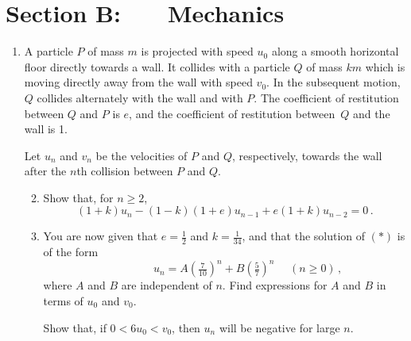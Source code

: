 \documentclass[a4, 11pt]{report}
\newlength{\qspace}
\newcounter{qnumber}
\newenvironment{question}%
 {\vspace{\qspace}
  \begin{enumerate}[\bfseries 1\quad][10]%
    \setcounter{enumi}{\value{qnumber}}%
    \item%
 }
{
  \end{enumerate}
  \filbreak
  \stepcounter{qnumber}
 }
\newenvironment{questionparts}[1][1]%
 {
  \begin{enumerate}[\bfseries (i)]%
    \setcounter{enumii}{#1}
    \addtocounter{enumii}{-1}
    \setlength{\itemsep}{3mm}
    \setlength{\parskip}{8pt}
 }
 {
  \end{enumerate}
 }
\def\ge{\geqslant}
\begin{document}
\newpage

\section*{Section B: \ \ \ Mechanics}


\begin{question}
A particle $P$ of mass $m$ is projected 
with speed $u_0$
 along a smooth
horizontal floor
directly towards a wall.
 It collides with a particle $Q$ of mass
$km$ which is moving directly away from the wall
with speed
$v_0$. 
In the subsequent motion, $Q$ collides alternately
with the wall and with $P$. 
 The coefficient of restitution between $Q$ and $P$ is $e$, and 
the coefficient of restitution between~$Q$ and the wall is 1.

Let $u_n$ and $v_n$ be the velocities of  $P$ and $Q$, respectively,
towards the wall after the $n$th 
collision between $P$ and $Q$. 

\begin{questionparts}
\item
Show that, for $n\ge2$,
\[
(1+k)u_{n} - (1-k)(1+e)u_{n-1} + e(1+k)u_{n-2} =0\,.
\tag{$*$}
\]

\item
You are now given that $e=\frac12$ and  $k = \frac1{34}$, and that the 
solution of  
$(*)$  is of  the form  
\[
\phantom{(n\ge0)}
u_n=
A\left( \tfrac 7{10}\right)^n
+
B\left( \tfrac 5{7 }\right)^n
\ \ \ \ \ \ 
(n\ge0)
\,,
\]
where $A$ and $B$ are independent of $n$.
Find expressions for $A$ and $B$ in terms of $u_0$ and $v_0$.

Show that, if $0<6u_0<v_0$, then $u_n$ will be negative for 
large $n$.

\end{questionparts}
\end{question}
\end{document}
